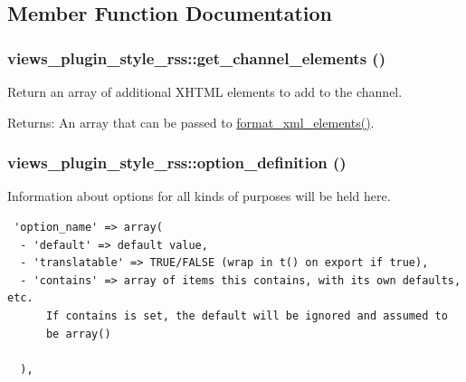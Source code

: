 \subsection{Member Function Documentation}
\hypertarget{classviews__plugin__style__rss_fce443c4f7053fc7e9a2043ae0848cd7}{
\subsubsection[{get\_\-channel\_\-elements}]{\setlength{\rightskip}{0pt plus 5cm}views\_\-plugin\_\-style\_\-rss::get\_\-channel\_\-elements ()}}
\label{classviews__plugin__style__rss_fce443c4f7053fc7e9a2043ae0848cd7}


Return an array of additional XHTML elements to add to the channel.

\begin{Desc}
\item[Returns:]An array that can be passed to \hyperlink{group__format_gfb344c648e6b63c35950d2889430e4c7}{format\_\-xml\_\-elements()}. \end{Desc}
\hypertarget{classviews__plugin__style__rss_b65464713d5256b32dbb4eea3e6d76ed}{
\subsubsection[{option\_\-definition}]{\setlength{\rightskip}{0pt plus 5cm}views\_\-plugin\_\-style\_\-rss::option\_\-definition ()}}
\label{classviews__plugin__style__rss_b65464713d5256b32dbb4eea3e6d76ed}


Information about options for all kinds of purposes will be held here. 

\begin{Code}\begin{verbatim} 'option_name' => array(
  - 'default' => default value,
  - 'translatable' => TRUE/FALSE (wrap in t() on export if true),
  - 'contains' => array of items this contains, with its own defaults, etc.
      If contains is set, the default will be ignored and assumed to
      be array()

  ),
\end{verbatim}
\end{Code}

